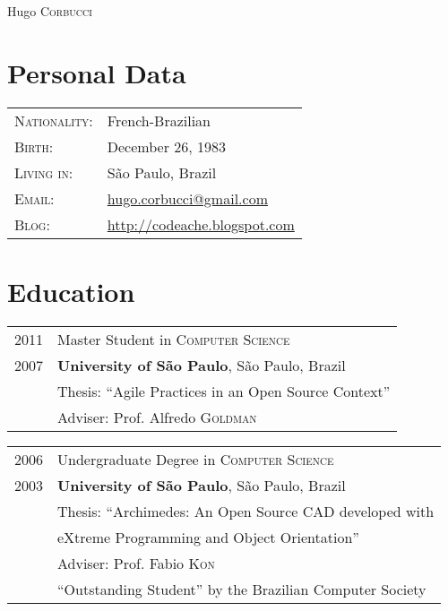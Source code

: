 \documentclass[letter,10pt]{article}
\begin{document}
\par{\centering
		{\Huge Hugo \textsc{Corbucci}
	}\bigskip\par}

      \section{Personal Data}

\begin{tabular}{p{2.5cm}l}
  \textsc{Nationality:} & French-Brazilian
  \\
  \textsc{Birth:} & December 26, 1983 \\
  \textsc{Living in:}   & São Paulo, Brazil \\
  \textsc{Email:}     &
  \href{mailto:hugo.corbucci@gmail.com}{hugo.corbucci@gmail.com}\\
  \textsc{Blog:}     & \href{http://codeache.blogspot.com}{http://codeache.blogspot.com}
\end{tabular}

\section{Education}
\begin{tabular}{p{2.5cm}l}
  \textsc{2011} & Master Student in \textsc{Computer Science}\\
  \textsc{2007} & \textbf{University of São Paulo}, São Paulo, Brazil\\
  & Thesis: ``Agile Practices in an Open Source Context''\\
  & \small Adviser: Prof. Alfredo \textsc{Goldman}\\
\end{tabular}

\begin{tabular}{p{2.5cm}l}
  \textsc{2006} & Undergraduate Degree in \textsc{Computer Science}\\
  \textsc{2003} &\normalsize\textbf{University of São Paulo}, São
  Paulo, Brazil\\
  & Thesis: ``Archimedes: An Open Source CAD developed with\\
  & eXtreme Programming and Object Orientation''\\
  & \small Adviser: Prof. Fabio \textsc{Kon}\\
  & ``Outstanding Student'' by the Brazilian Computer Society\\
\end{tabular}
\end{document}
